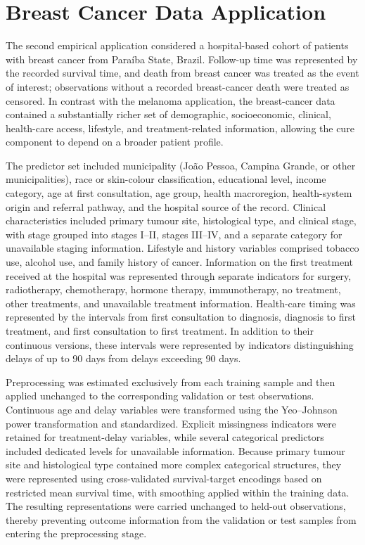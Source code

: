 \section{Breast Cancer Data Application}\label{sec:cancer-data-application}

The second empirical application considered a hospital-based cohort of
patients with breast cancer from Paraíba State, Brazil. Follow-up time was
represented by the recorded survival time, and death from breast cancer was
treated as the event of interest; observations without a recorded
breast-cancer death were treated as censored. In contrast with the melanoma application, the breast-cancer data
contained a substantially richer set of demographic, socioeconomic,
clinical, health-care access, lifestyle, and treatment-related information,
allowing the cure component to depend on a broader patient profile.

The predictor set included municipality (João Pessoa, Campina Grande, or
other municipalities), race or skin-colour classification, educational
level, income category, age at first consultation, age group, health
macroregion, health-system origin and referral pathway, and the hospital
source of the record. Clinical characteristics included primary tumour
site, histological type, and clinical stage, with stage grouped into
stages I--II, stages III--IV, and a separate category for unavailable
staging information. Lifestyle and history variables comprised tobacco
use, alcohol use, and family history of cancer. Information on the first
treatment received at the hospital was represented through separate
indicators for surgery, radiotherapy, chemotherapy, hormone therapy,
immunotherapy, no treatment, other treatments, and unavailable treatment
information. Health-care timing was represented by the intervals from
first consultation to diagnosis, diagnosis to first treatment, and first
consultation to first treatment. In addition to their continuous versions,
these intervals were represented by indicators distinguishing delays of up
to 90 days from delays exceeding 90 days.

Preprocessing was estimated exclusively from each training sample and then
applied unchanged to the corresponding validation or test observations.
Continuous age and delay variables were transformed using the Yeo--Johnson
power transformation\cite{yeo2000new} and standardized. Explicit missingness indicators were
retained for treatment-delay variables, while several categorical predictors
included dedicated levels for unavailable information. Because primary
tumour site and histological type contained more complex categorical
structures, they were represented using cross-validated survival-target
encodings based on restricted mean survival time, with smoothing applied
within the training data. The resulting representations were carried
unchanged to held-out observations, thereby preventing outcome information
from the validation or test samples from entering the preprocessing stage.

